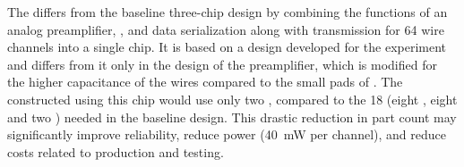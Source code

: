 %
%



The    differs from the baseline three-chip design by combining the functions of an analog preamplifier, , and data serialization along with transmission for 64 wire channels into a single chip. It is based on a design developed for the  experiment~\cite{nEXO} and differs from it only in the design of the preamplifier, which is modified for the higher capacitance of the   wires compared to the small pads of . The  constructed using this chip would use only two , compared to the 18 (eight , eight  and two ) needed in the baseline design. This drastic reduction in part count may significantly improve  reliability, reduce power (\SI{40}{mW} per channel), and reduce costs related to production and testing.

